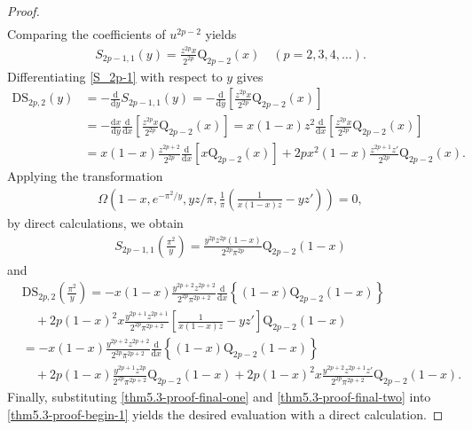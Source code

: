 \documentclass[11pt]{article}
\theoremstyle{plain}
\theoremstyle{definition}
\begin{document}
\begin{proof}
\begin{align*}
\end{align*}
Comparing the coefficients of $u^{2p-2}$ yields
\begin{align}\label{S_2p-1}
S_{2p-1,1}\left( y \right) =\frac{z^{2p}x}{2^{2p}}\mathrm{Q}_{2p-2}\left( x \right)\quad (p=2,3,4,\ldots).
\end{align}
Differentiating \eqref{S_2p-1}   with respect to $y$ gives
\begin{align}
 \text{DS}_{2p,2}\left( y \right)&=-\frac{\mathrm{d}}{\mathrm{d}y}S_{2p-1,1}\left( y \right) =-\frac{\mathrm{d}}{\mathrm{d}y}\left[ \frac{z^{2p}x}{2^{2p}}\mathrm{Q}_{2p-2}\left( x \right) \right]
\nonumber\\
 &=-\frac{\mathrm{d}x}{\mathrm{d}y}\frac{\mathrm{d}}{\mathrm{d}x}\left[ \frac{z^{2p}x}{2^{2p}}\mathrm{Q}_{2p-2}\left( x \right) \right] =x\left( 1-x \right) z^2\frac{\mathrm{d}}{\mathrm{d}x}\left[ \frac{z^{2p}x}{2^{2p}}\mathrm{Q}_{2p-2}\left( x \right) \right]\nonumber
\\
 &=x\left( 1-x \right) \frac{z^{2p+2}}{2^{2p}}\frac{\mathrm{d}}{\mathrm{d}x}\left[ x\mathrm{Q}_{2p-2}\left( x \right) \right] +2px^2\left( 1-x \right) \frac{z^{2p+1}z'}{2^{2p}}\mathrm{Q}_{2p-2}\left( x \right).\label{thm-prof-series-two}
 	\end{align}
Applying the transformation
\begin{align}\label{pi^2/y}
  \Omega \left( 1-x,e^{-\pi ^2/y},yz/\pi ,\frac{1}{\pi}\left( \frac{1}{x\left( 1-x \right) z}-yz' \right) \right) =0,	
\end{align}
by direct calculations, we obtain
\begin{align}\label{thm5.3-proof-final-one}
S_{2p-1,1}\left( \frac{\pi ^2}{y} \right) =\frac{y^{2p}z^{2p}\left( 1-x \right)}{2^{2p}\pi ^{2p}}\mathrm{Q}_{2p-2}\left( 1-x \right)
\end{align}
and
\begin{align}\label{thm5.3-proof-final-two}
&\text{DS}_{2p,2}\left( \frac{\pi ^2}{y} \right)\nonumber
=-x\left( 1-x \right) \frac{y^{2p+2}z^{2p+2}}{2^{2p}\pi ^{2p+2}}\frac{\mathrm{d}}{\mathrm{d}x}\left\{ \left( 1-x \right) \mathrm{Q}_{2p-2}\left( 1-x \right) \right\}
\nonumber\\
&\quad+2p\left( 1-x \right) ^2x\frac{y^{2p+1}z^{2p+1}}{2^{2p}\pi ^{2p+2}}\left[ \frac{1}{x\left( 1-x \right) z}-yz' \right] \mathrm{Q}_{2p-2}\left( 1-x \right)
\nonumber\\
&=-x\left( 1-x \right) \frac{y^{2p+2}z^{2p+2}}{2^{2p}\pi ^{2p+2}}\frac{\mathrm{d}}{\mathrm{d}x}\left\{ \left( 1-x \right) \mathrm{Q}_{2p-2}\left( 1-x \right) \right\}
\nonumber\\
&\quad+2p\left( 1-x \right) \frac{y^{2p+1}z^{2p}}{2^{2p}\pi ^{2p+2}}\mathrm{Q}_{2p-2}\left( 1-x \right) +2p\left( 1-x \right) ^2x\frac{y^{2p+2}z^{2p+1}z'}{2^{2p}\pi ^{2p+2}}\mathrm{Q}_{2p-2}\left( 1-x \right).
\end{align}
Finally, substituting \eqref{thm5.3-proof-final-one} and \eqref{thm5.3-proof-final-two} into \eqref{thm5.3-proof-begin-1} yields the desired evaluation with a direct calculation.
\end{proof}
\end{document}
